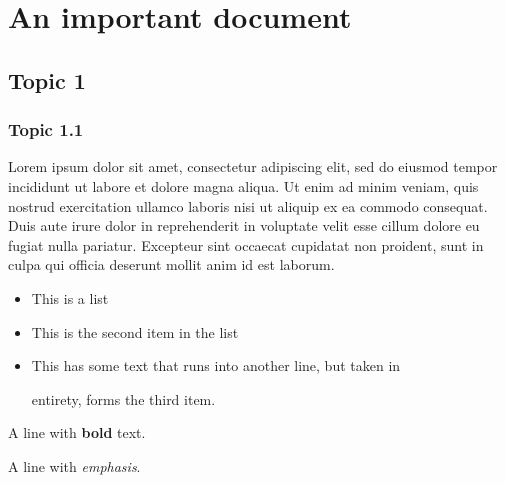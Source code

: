 \documentclass[12pt, a4paper]{article}
\begin{document}
\section*{An important document}
\subsection*{Topic 1}
\subsubsection*{Topic 1.1}
\begin{flushleft}
Lorem ipsum dolor sit amet, consectetur adipiscing elit, sed do
eiusmod tempor incididunt ut labore et dolore magna aliqua. Ut enim ad
minim veniam, quis nostrud exercitation ullamco laboris nisi ut
aliquip ex ea commodo consequat. Duis aute irure dolor in
reprehenderit in voluptate velit esse cillum dolore eu fugiat nulla
pariatur. Excepteur sint occaecat cupidatat non proident, sunt in
culpa qui officia deserunt mollit anim id est laborum.
\end{flushleft}
\begin{itemize}
\item This is a list
 
\item This is the second item in the list
 
\item This has some text that runs into another line, but taken in 
 
entirety, forms the third item.
\end{itemize}
\begin{flushleft}
A line with \textbf{bold} text.
\end{flushleft}
\begin{flushleft}
A line with \emph{emphasis}.
\end{flushleft}
\end{document}
